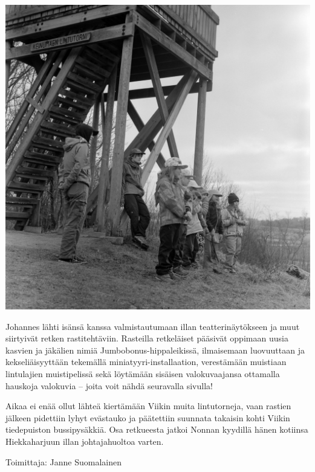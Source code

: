 \begin{multicols}{2}
	\columnbreak

	\vspace*{-0.32cm}
	\noindent\includegraphics[width=\linewidth]{assets/kolkkienpäiväretkibw15}

	Johannes lähti isänsä kanssa valmistautumaan illan teatterinäytökseen
	ja muut siirtyivät retken rastitehtäviin. Rasteilla retkeläiset
	pääsivät oppimaan uusia kasvien ja jäkälien nimiä
	Jumbobonus-hippaleikissä, ilmaisemaan luovuuttaan ja kekseliäisyyttään
	tekemällä miniatyyri-installaation, verestämään muistiaan lintulajien
	muistipelissä sekä löytämään sisäisen valokuvaajansa ottamalla hauskoja
	valokuvia – joita voit nähdä seuravalla sivulla!

	\columnbreak

	Aikaa ei enää ollut lähteä kiertämään Viikin muita lintutorneja, vaan
	rastien jälkeen pidettiin lyhyt evästauko ja päätettiin suunnata
	takaisin kohti Viikin tiedepuiston bussipysäkkiä. Osa retkueesta jatkoi
	Nonnan kyydillä hänen kotiinsa Hiekkaharjuun illan johtajahuoltoa
	varten.

	\vspace*{0.32cm}

	\raggedleft Toimittaja: Janne Suomalainen\\


\end{multicols}
